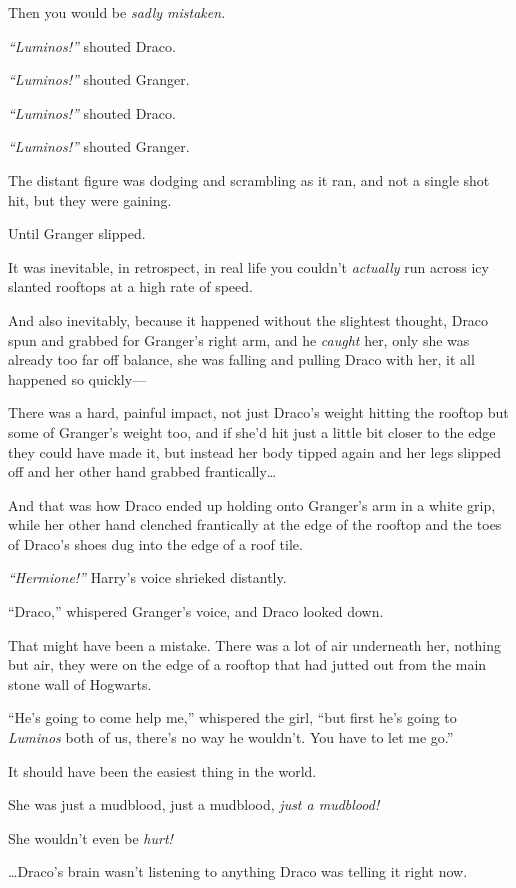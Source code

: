 Then you would be \emph{sadly mistaken.}

\emph{``Luminos!''} shouted Draco.

\emph{``Luminos!''} shouted Granger.

\emph{``Luminos!''} shouted Draco.

\emph{``Luminos!''} shouted Granger.

The distant figure was dodging and scrambling as it ran, and not a
single shot hit, but they were gaining.

Until Granger slipped.

It was inevitable, in retrospect, in real life you couldn't
\emph{actually} run across icy slanted rooftops at a high rate of speed.

And also inevitably, because it happened without the slightest thought,
Draco spun and grabbed for Granger's right arm, and he \emph{caught}
her, only she was already too far off balance, she was falling and
pulling Draco with her, it all happened so quickly---

There was a hard, painful impact, not just Draco's weight hitting the
rooftop but some of Granger's weight too, and if she'd hit just a little
bit closer to the edge they could have made it, but instead her body
tipped again and her legs slipped off and her other hand grabbed
frantically\ldots{}

And that was how Draco ended up holding onto Granger's arm in a white
grip, while her other hand clenched frantically at the edge of the
rooftop and the toes of Draco's shoes dug into the edge of a roof tile.

\emph{``Hermione!''} Harry's voice shrieked distantly.

``Draco,'' whispered Granger's voice, and Draco looked down.

That might have been a mistake. There was a lot of air underneath her,
nothing but air, they were on the edge of a rooftop that had jutted out
from the main stone wall of Hogwarts.

``He's going to come help me,'' whispered the girl, ``but first he's
going to \emph{Luminos} both of us, there's no way he wouldn't. You have
to let me go.''

It should have been the easiest thing in the world.

She was just a mudblood, just a mudblood, \emph{just a mudblood!}

She wouldn't even be \emph{hurt!}

\ldots{}Draco's brain wasn't listening to anything Draco was telling it
right now.

